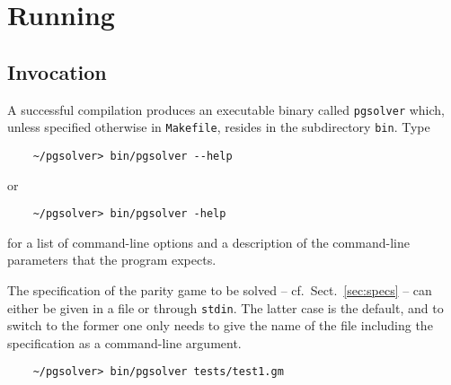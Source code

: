 \section{Running \pgsolver}

\subsection{Invocation}

A successful compilation produces an executable binary called \texttt{pgsolver} which, unless
specified otherwise in \texttt{Makefile}, resides in the subdirectory \texttt{bin}. Type
\begin{verbatim}
    ~/pgsolver> bin/pgsolver --help
\end{verbatim}
or
\begin{verbatim}
    ~/pgsolver> bin/pgsolver -help
\end{verbatim}
for a list of command-line options and a description of the command-line parameters that the
program expects.

The specification of the parity game to be solved -- cf.\ Sect.~\ref{sec:specs} -- can either be
given in a file or through \texttt{stdin}. The latter case is the default, and to switch to the
former one only needs to give the name of the file including the specification as a command-line
argument.
\begin{verbatim}
    ~/pgsolver> bin/pgsolver tests/test1.gm
\end{verbatim}


